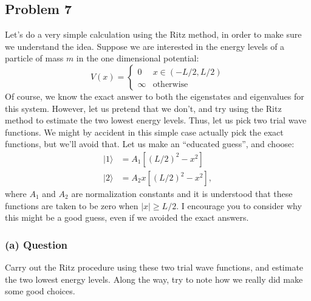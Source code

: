 \documentclass{article}
\begin{document}
\subsection*{Problem 7}
Let's do a very simple calculation using the Ritz method, in order to make sure we understand the idea. Suppose we are interested in the energy levels of a particle of mass \( m \) in the one dimensional potential:
\begin{equation}
    V(x) = \begin{cases}
    0 & x \in (-L/2, L/2) \\
    \infty & \text{otherwise}
    \end{cases}
\end{equation}
Of course, we know the exact answer to both the eigenstates and eigenvalues for this system. However, let us pretend that we don't, and try using the Ritz method to estimate the two lowest energy levels. Thus, let us pick two trial wave functions. We might by accident in this simple case actually pick the exact functions, but we'll avoid that. Let us make an ``educated guess'', and choose:
\begin{align}
    |1\rangle &= A_1 \left[ (L/2)^2 - x^2 \right] \\
    |2\rangle &= A_2 x \left[ (L/2)^2 - x^2 \right],
\end{align}
where \( A_1 \) and \( A_2 \) are normalization constants and it is understood that these functions are taken to be zero when \( |x| \geq L/2 \). I encourage you to consider why this might be a good guess, even if we avoided the exact answers.

\subsubsection*{(a) Question}
Carry out the Ritz procedure using these two trial wave functions, and estimate the two lowest energy levels. Along the way, try to note how we really did make some good choices.
\end{document}
